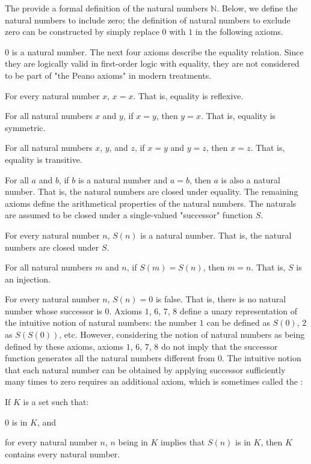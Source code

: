 \documentclass[a4paper,12pt]{article}
\begin{document}
The  provide a formal definition of the natural numbers $\mathbb{N}$. Below, we define the natural numbers to include zero; the definition of natural numbers to exclude zero can be constructed by simply replace $0$ with $1$ in the following axioms.
\bit
\item $0$ is a natural number.
\eit
The next four axioms describe the equality relation. Since they are logically valid in first-order logic with equality, they are not considered to be part of "the Peano axioms" in modern treatments.
\bit
\item For every natural number $x$, $x=x$. That is, equality is reflexive.
\item For all natural numbers $x$ and $y$, if $x=y$, then $y=x$. That is, equality is symmetric.
\item For all natural numbers $x$, $y$, and $z$, if $x=y$ and $y=z$, then $x=z$. That is, equality is transitive.
\item For all $a$ and $b$, if $b$ is a natural number and $a=b$, then $a$ is also a natural number. That is, the natural numbers are closed under equality.
\eit
The remaining axioms define the arithmetical properties of the natural numbers. The naturals are assumed to be closed under a single-valued "successor" function $S$.
\bit
\item For every natural number $n$, $S(n)$ is a natural number. That is, the natural numbers are closed under $S$.
\item For all natural numbers $m$ and $n$, if $S(m)=S(n)$, then $m=n$. That is, $S$ is an injection.
\item For every natural number $n$, $S(n)=0$ is false. That is, there is no natural number whose successor is $0$.
\eit
Axioms $1$, $6$, $7$, $8$ define a unary representation of the intuitive notion of natural numbers: the number $1$ can be defined as $S(0)$, $2$ as $S(S(0))$, etc. However, considering the notion of natural numbers as being defined by these axioms, axioms $1$, $6$, $7$, $8$ do not imply that the successor function generates all the natural numbers different from $0$. The intuitive notion that each natural number can be obtained by applying successor sufficiently many times to zero requires an additional axiom, which is sometimes called the :
\bit
\item If $K$ is a set such that:
\bit
\item[] $0$ is in $K$, and
\item[] for every natural number $n$, $n$ being in $K$ implies that $S(n)$ is in $K$,
\eit
then $K$ contains every natural number.
\eit
\end{document}
